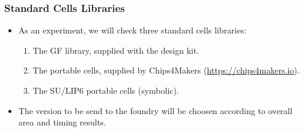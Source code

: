\documentclass[10pt,aspectratio=169,presentation]{beamer}
\begin{document}
   \begin{frame}
     \frametitle{Standard Cells Libraries}
     \begin{itemize}
       \setlength\itemsep{1.0\baselineskip}
       \item As an experiment, we will check three standard cells libraries:
             \begin{enumerate}
               \setlength\itemsep{1.0\baselineskip}
               \item The GF library, supplied with the design kit.
               \item The portable cells, supplied by Chips4Makers (\url{https://chips4makers.io}).
               \item The SU/LIP6 portable cells (symbolic).
             \end{enumerate}
       \item The version to be send to the foundry will be choosen according
             to overall area and timing results.
     \end{itemize}
   \end{frame}


 
\end{document}
